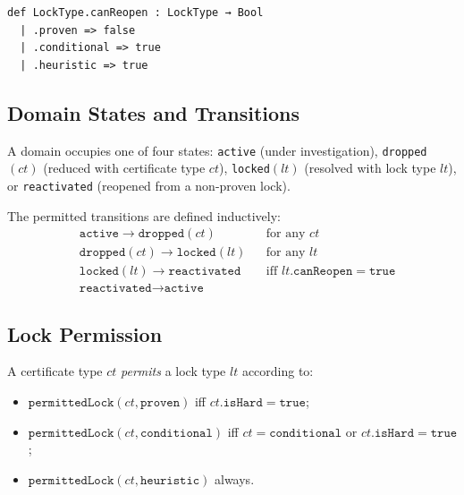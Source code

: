 \documentclass[runningheads]{llncs}
\begin{document}
\begin{lstlisting}
def LockType.canReopen : LockType → Bool
  | .proven => false
  | .conditional => true
  | .heuristic => true
\end{lstlisting}

\subsection{Domain States and Transitions}

\begin{definition}
\label{def:state}
A domain occupies one of four states: \texttt{active} (under investigation),
\texttt{dropped}$(ct)$ (reduced with certificate type $ct$),
\texttt{locked}$(lt)$ (resolved with lock type $lt$), or \texttt{reactivated}
(reopened from a non-proven lock).
\end{definition}

\begin{definition}
\label{def:transition}
The permitted transitions are defined inductively:
\begin{align}
  &\texttt{active} \to \texttt{dropped}(ct) &&\text{for any } ct \label{eq:t1}\\
  &\texttt{dropped}(ct) \to \texttt{locked}(lt) &&\text{for any } lt \label{eq:t2}\\
  &\texttt{locked}(lt) \to \texttt{reactivated} &&\text{iff } lt.\texttt{canReopen} = \texttt{true} \label{eq:t3}\\
  &\texttt{reactivated} \to \texttt{active} && \label{eq:t4}
\end{align}
\end{definition}

\subsection{Lock Permission}

\begin{definition}
\label{def:permitted}
A certificate type $ct$ \emph{permits} a lock type $lt$ according to:
\begin{itemize}
\item $\texttt{permittedLock}(ct, \texttt{proven})$ iff $ct.\texttt{isHard} = \texttt{true}$;
\item $\texttt{permittedLock}(ct, \texttt{conditional})$ iff $ct = \texttt{conditional}$ or $ct.\texttt{isHard} = \texttt{true}$;
\item $\texttt{permittedLock}(ct, \texttt{heuristic})$ always.
\end{itemize}
\end{definition}
\end{document}
